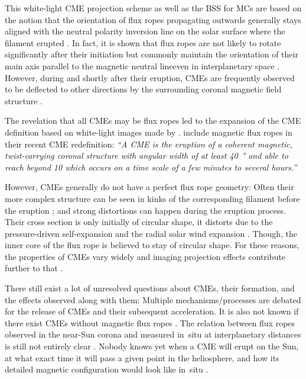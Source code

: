 This white-light CME projection scheme as well as the BSS for MCs are based on the notion that the orientation of flux ropes propagating outwards generally stays aligned with the neutral polarity inversion line on the solar surface where the filament erupted \citep{Marubashi1997,Bothmer1998}. In fact, it is shown that flux ropes are not likely to rotate significantly after their initiation but commonly maintain the orientation of their main axis parallel to the magnetic neutral line\pagebreak even in interplanetary space \citep{Marubashi2015}. However, during and shortly after their eruption, CMEs are frequently observed to be deflected to other directions by the surrounding coronal magnetic field structure \citep{Sterling2011}.

The revelation that all CMEs may be flux ropes \citep{Vourlidas2013,Marubashi2015} led to the expansion of the CME definition based on white-light images made by \citet{Hundhausen1984}. \citet{Vourlidas2013,Vourlidas2014} include magnetic flux ropes in their recent CME redefinition: \textit{``A CME is the eruption of a coherent magnetic, twist-carrying coronal structure with angular width of at least \SI{40}{\degree} and able to reach beyond \SI{10}{\Rs} which occurs on a time scale of a few minutes to several hours.''}

However, CMEs generally do not have a perfect flux rope geometry: Often their more complex structure can be seen in kinks of the corresponding filament before the eruption \citep{Bothmer2017}; and strong distortions can happen during the eruption process. Their cross section is only initially of circular shape, it distorts due to the pressure-driven self-expansion and the radial solar wind expansion \citep{Owens2006}. Though, the inner core of the flux rope is believed to stay of circular shape. For these reasons, the properties of CMEs vary widely and imaging projection effects contribute further to that \citep{Cremades2004}.

There still exist a lot of unresolved questions about CMEs, their formation, and the effects observed along with them: Multiple mechanisms/processes are debated for the release of CMEs and their subsequent acceleration. It is also not known if there exist CMEs without magnetic flux ropes \citep{Vourlidas2013}. The relation between flux ropes observed in the near-Sun corona and measured in~situ at interplanetary distances is still not entirely clear \citep{Vourlidas2014}. Nobody knows yet when a CME will erupt on the Sun, at what exact time it will pass a given point in the heliosphere, and how its detailed magnetic configuration would look like in~situ \citep{Gopalswamy2016}.

